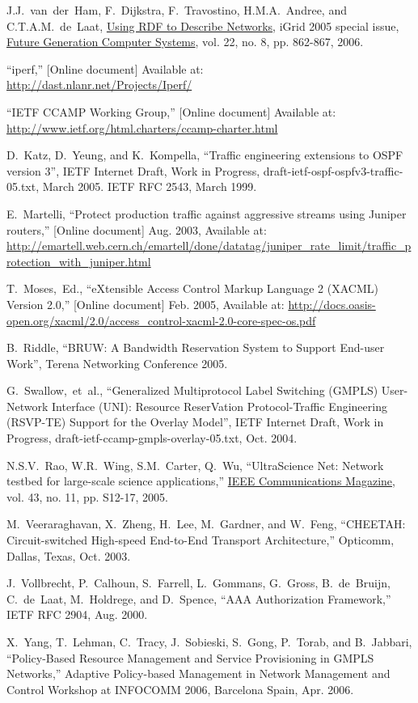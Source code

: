 \documentclass[conference]{IEEEtran}
\begin{document}
\begin{thebibliography}{1}
J.J.~van~der~Ham, F.~Dijkstra, F.~Travostino, H.M.A.~Andree, and C.T.A.M.~de~Laat,
\underline{Using RDF to Describe Networks},
iGrid 2005 special issue,
\underline{Future Generation Computer Systems},
vol. 22, no. 8, pp. 862-867, 2006.

``iperf,'' [Online document] Available at: \\
\url{http://dast.nlanr.net/Projects/Iperf/}

``IETF CCAMP Working Group,'' [Online document] Available at:
\url{http://www.ietf.org/html.charters/ccamp-charter.html}

D.~Katz, D.~Yeung, and K.~Kompella,
``Traffic engineering extensions to OSPF version 3'',
IETF Internet Draft, Work in Progress,
draft-ietf-ospf-ospfv3-traffic-05.txt, March 2005.
IETF RFC 2543, March 1999.

E.~Martelli,
``Protect production traffic against aggressive streams using Juniper routers,''
[Online document] Aug. 2003, Available at:
\url{http://emartell.web.cern.ch/emartell/done/datatag/juniper_rate_limit/traffic_protection_with_juniper.html}

T.~Moses,~Ed.,
``eXtensible Access Control Markup Language 2 (XACML) Version 2.0,''
[Online document] Feb. 2005, Available at:
\url{http://docs.oasis-open.org/xacml/2.0/access_control-xacml-2.0-core-spec-os.pdf}

B.~Riddle,
``BRUW: A Bandwidth Reservation System to Support End-user Work'',
Terena Networking Conference 2005.

G.~Swallow,~et~al.,
``Generalized Multiprotocol Label Switching (GMPLS) User-Network Interface
(UNI): Resource ReserVation Protocol-Traffic Engineering (RSVP-TE) Support
for the Overlay Model'', IETF Internet Draft, Work in Progress,
draft-ietf-ccamp-gmpls-overlay-05.txt, Oct. 2004.

N.S.V.~Rao, W.R.~Wing, S.M.~Carter, Q.~Wu,
``UltraScience Net: Network testbed for large-scale science applications,''
\underline{IEEE Communications Magazine}, vol. 43, no. 11, pp. S12-17, 2005.

M.~Veeraraghavan, X.~Zheng, H.~Lee, M.~Gardner, and W.~Feng,
``CHEETAH: Circuit-switched High-speed End-to-End Transport Architecture,''
Opticomm, Dallas, Texas, Oct. 2003.

J.~Vollbrecht, P.~Calhoun, S.~Farrell, L.~Gommans, G.~Gross, B.~de~Bruijn,
C.~de~Laat, M.~Holdrege, and D.~Spence,
``AAA Authorization Framework,'' IETF RFC 2904, Aug. 2000.

X.~Yang, T.~Lehman, C.~Tracy, J.~Sobieski, S.~Gong, P.~Torab, and B.~Jabbari,
``Policy-Based Resource Management and Service Provisioning in GMPLS Networks,''
Adaptive Policy-based Management in Network Management and Control Workshop
at INFOCOMM 2006, Barcelona Spain, Apr. 2006.

\end{thebibliography}
\end{document}
